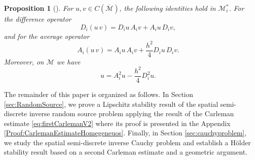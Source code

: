 \documentclass[11pt,oneside,leqno]{amsart}
\numberwithin{equation}{section}
\numberwithin{equation}{section}
\newtheorem{proposition}[theorem]{Proposition}
\begin{document}
\begin{proposition}[{\cite[Lemma 2.1 and 2.2]{BHLR:2010b}}]\label{pro:product}
For $u,v\in C(\overline{\mathcal{M}})$, the following identities hold in $\mathcal{M}^{\ast}_{i}$. For the difference operator
\begin{equation}\label{eq:difference:product}
    D_{i}(u\,v)=D_{i}u\, A_{i}v+A_{i}u\,D_{i}v,
\end{equation}
and for the average operator 
\begin{equation}\label{eq:average:product}
     A_{i}(u\,v)= A_{i}u\,A_{i}v+\frac{h^{2}}{4}D_{i}u\,D_{i}v.
\end{equation}
Moreover, on ${\mathcal{M}}$ we have
\begin{equation}\label{eq:averengeanddifference}
    u=A^2_i u-\frac{h^2}{4}D^2_iu.
\end{equation}
\end{proposition}
The remainder of this paper is organized as follows. In Section \ref{sec:RandomSource}, we prove a Lipschitz stability result of the spatial semi-discrete inverse random source problem applying the result of the Carleman estimate \eqref{eq:firstCarlemanV2} where its proof is presented in the Appendix \ref{Proof:CarlemanEstimateHomegeneuos}. Finally, in Section \ref{sec:cauchyproblem}, we study the spatial semi-discrete inverse Cauchy problem and establish a Hölder stability result based on a second Carleman estimate and a geometric argument.

\end{document}
